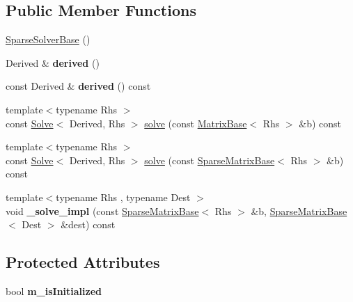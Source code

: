 \subsection*{Public Member Functions}
\begin{DoxyCompactItemize}
\item 
\mbox{\hyperlink{class_eigen_1_1_sparse_solver_base_aacd99fa17db475e74d3834767f392f33}{Sparse\+Solver\+Base}} ()
\item 
\mbox{\label{class_eigen_1_1_sparse_solver_base_ad213fb2c2199ca597b96f1f79653637f}} 
Derived \& {\bfseries derived} ()
\item 
\mbox{\label{class_eigen_1_1_sparse_solver_base_af5f23a7e048060c3082c5a1ddfa91932}} 
const Derived \& {\bfseries derived} () const
\item 
{\footnotesize template$<$typename Rhs $>$ }\\const \mbox{\hyperlink{class_eigen_1_1_solve}{Solve}}$<$ Derived, Rhs $>$ \mbox{\hyperlink{class_eigen_1_1_sparse_solver_base_a4a66e9498b06e3ec4ec36f06b26d4e8f}{solve}} (const \mbox{\hyperlink{class_eigen_1_1_matrix_base}{Matrix\+Base}}$<$ Rhs $>$ \&b) const
\item 
{\footnotesize template$<$typename Rhs $>$ }\\const \mbox{\hyperlink{class_eigen_1_1_solve}{Solve}}$<$ Derived, Rhs $>$ \mbox{\hyperlink{class_eigen_1_1_sparse_solver_base_a3a8d97173b6e2630f484589b3471cfc7}{solve}} (const \mbox{\hyperlink{class_eigen_1_1_sparse_matrix_base}{Sparse\+Matrix\+Base}}$<$ Rhs $>$ \&b) const
\item 
\mbox{\label{class_eigen_1_1_sparse_solver_base_a886c757fea6fe1d992a66524213f14fb}} 
{\footnotesize template$<$typename Rhs , typename Dest $>$ }\\void {\bfseries \+\_\+solve\+\_\+impl} (const \mbox{\hyperlink{class_eigen_1_1_sparse_matrix_base}{Sparse\+Matrix\+Base}}$<$ Rhs $>$ \&b, \mbox{\hyperlink{class_eigen_1_1_sparse_matrix_base}{Sparse\+Matrix\+Base}}$<$ Dest $>$ \&dest) const
\end{DoxyCompactItemize}
\subsection*{Protected Attributes}
\begin{DoxyCompactItemize}
\item 
\mbox{\label{class_eigen_1_1_sparse_solver_base_ac52101f69d048d5c4b036eadf1f13673}} 
bool {\bfseries m\+\_\+is\+Initialized}
\end{DoxyCompactItemize}


